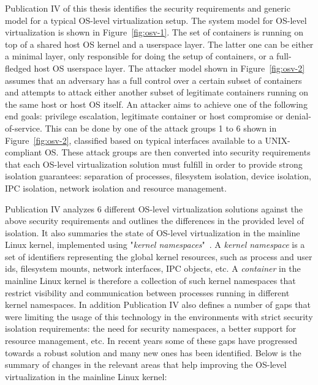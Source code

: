 Publication IV of this thesis identifies the security requirements and generic model for a typical OS-level virtualization setup.
The system model for OS-level virtualization is shown in Figure~\ref{fig:osv-1}. The set of containers  is running on top of a shared host OS kernel and a userspace layer. The latter one can be either a minimal layer, only responsible for doing the setup of containers, or a full-fledged host OS userspace layer. The attacker model shown in Figure~\ref{fig:osv-2} assumes that an adversary has a full control over a certain subset of containers and attempts to attack either another subset of legitimate containers running on the same host or host OS itself. An attacker aims to achieve one of the following end goals: privilege escalation, legitimate container or host compromise or denial-of-service. This can be done by one of the attack groups 1 to 6 shown in Figure~\ref{fig:osv-2}, classified based on typical interfaces available to a UNIX-compliant OS. These attack groups are then converted into security requirements that each OS-level virtualization solution must fulfill in order to provide strong isolation guarantees: separation of processes, filesystem isolation, device isolation, IPC isolation, network isolation and resource management.   

Publication IV analyzes 6 different OS-level virtualization solutions against the above security requirements and outlines the differences in the provided level of isolation. It also summaries the state of OS-level virtualization in the mainline Linux kernel, implemented using "\textit{kernel namespaces}"~\cite{biederman2006}. A \textit{kernel namespace} is a set of identifiers representing the global kernel resources, such as process and user ids, filesystem mounts, network interfaces, IPC objects, etc. A \textit{container} in the mainline Linux kernel is therefore a collection of such kernel namespaces that restrict visibility and communication between processes running in different kernel namespaces. In addition Publication IV also defines a number of gaps that were limiting the usage of this technology in the environments with strict security isolation requirements: the need for security namespaces, a better support for resource management, etc. In recent years some of these gaps have progressed towards a robust solution and many new ones has been identified. Below is the summary of changes in the relevant areas that help improving the OS-level virtualization in the mainline Linux kernel:  

